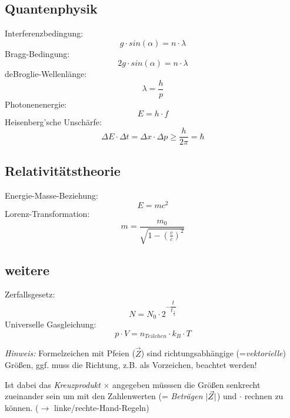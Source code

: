 \documentclass[12pt,a4paper,oneside]{article}
\begin{document}
\begin{multicols}{3}
\subsection*{Quantenphysik}
Interferenzbedingung:
$$ g \cdot sin(\alpha) = n \cdot \lambda $$
Bragg-Bedingung:
$$ 2 g \cdot sin(\alpha) = n \cdot \lambda $$
deBroglie-Wellenlänge:
$$ \lambda = \frac{h}{p} $$
Photonenenergie:
$$ E = h \cdot f $$
Heisenberg'sche Unschärfe:
$$ \Delta E \cdot \Delta t = \Delta x \cdot \Delta p \geq \frac{h}{2\pi} = \hbar $$

\subsection*{Relativitätstheorie}
Energie-Masse-Beziehung:
$$ E = mc^2 $$
Lorenz-Transformation:
$$ m = \frac{m_0}{\sqrt{1-(\frac{v}{c})^2}} $$

\subsection*{weitere}
Zerfallsgesetz:
$$ N = N_0 \cdot 2^{-\dfrac{t}{t_{\frac{1}{2}}}} $$
Universelle Gasgleichung:
$$ p \cdot V = n_{Teilchen} \cdot k_B \cdot T $$


\end{multicols}
\emph{Hinweis:} Formelzeichen mit Pfeien ($\vec{Z}$) sind richtungsabhängige (=\textit{vektorielle}) Größen, ggf. muss die Richtung, z.B. als Vorzeichen, beachtet werden!

Ist dabei das \textit{Kreuzprodukt} $\times$ angegeben müsssen die Größen senkrecht zueinander sein um mit den Zahlenwerten (= \textit{Beträgen} $\lvert\vec{Z}\rvert$) und $\cdot$ rechnen zu können. ($\rightarrow$ linke/rechte-Hand-Regeln)

\end{document}
